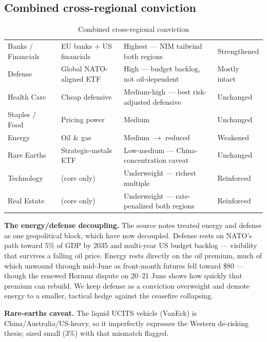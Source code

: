 \documentclass[11pt,a4paper]{article}
\begin{document}
\subsection{Combined cross-regional conviction}

\begin{table}[htbp]
\caption{Combined cross-regional conviction}
\small
\begin{tabularx}{\linewidth}{P{2.7cm} P{2.9cm} L P{2.5cm}}
\toprule
{} &  &  &  \\
\midrule
Banks / Financials & EU banks + US financials & Highest --- NIM tailwind both regions & Strengthened \\
Defense & Global NATO-aligned ETF & High --- budget backlog, not oil-dependent & Mostly intact \\
Health Care & Cheap defensive & Medium-high --- best risk-adjusted defensive & Unchanged \\
Staples / Food & Pricing power & Medium & Unchanged \\
Energy & Oil \& gas & Medium \(\rightarrow\) reduced & Weakened \\
Rare Earths & Strategic-metals ETF & Low-medium --- China-concentration caveat & Unchanged \\
Technology & (core only) & Underweight --- richest multiple & Reinforced \\
Real Estate & (core only) & Underweight --- rate-penalized both regions & Reinforced \\
\bottomrule
\end{tabularx}
\end{table}

\textbf{The energy/defense decoupling.} The source notes treated energy and defense as one geopolitical block, which have now decoupled. Defense rests on NATO's path toward 5\% of GDP by 2035 and multi-year US budget backlog --- visibility that survives a falling oil price. Energy rests directly on the oil premium, much of which unwound through mid-June as front-month futures fell toward \$80 --- though the renewed Hormuz dispute on 20--21 June shows how quickly that premium can rebuild. We keep defense as a conviction overweight and demote energy to a smaller, tactical hedge against the ceasefire collapsing.

\textbf{Rare-earths caveat.} The liquid UCITS vehicle (VanEck) is China/Australia/US-heavy, so it imperfectly expresses the Western de-risking thesis; sized small (3\%) with that mismatch flagged.
\end{document}
